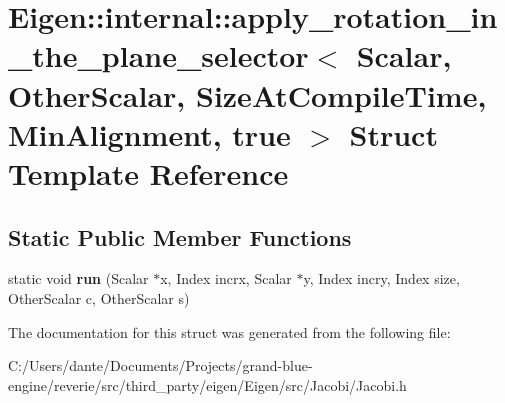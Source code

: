 \hypertarget{struct_eigen_1_1internal_1_1apply__rotation__in__the__plane__selector_3_01_scalar_00_01_other_scbca20de4cedcca0c18dc0bba81af1524}{}\section{Eigen\+::internal\+::apply\+\_\+rotation\+\_\+in\+\_\+the\+\_\+plane\+\_\+selector$<$ Scalar, Other\+Scalar, Size\+At\+Compile\+Time, Min\+Alignment, true $>$ Struct Template Reference}
\label{struct_eigen_1_1internal_1_1apply__rotation__in__the__plane__selector_3_01_scalar_00_01_other_scbca20de4cedcca0c18dc0bba81af1524}
\subsection*{Static Public Member Functions}
\begin{DoxyCompactItemize}
\item 
\mbox{\label{struct_eigen_1_1internal_1_1apply__rotation__in__the__plane__selector_3_01_scalar_00_01_other_scbca20de4cedcca0c18dc0bba81af1524_a0bd56f0d33dfe6f01354fa5df244ade9}} 
static void {\bfseries run} (Scalar $\ast$x, Index incrx, Scalar $\ast$y, Index incry, Index size, Other\+Scalar c, Other\+Scalar s)
\end{DoxyCompactItemize}


The documentation for this struct was generated from the following file\+:\begin{DoxyCompactItemize}
\item 
C\+:/\+Users/dante/\+Documents/\+Projects/grand-\/blue-\/engine/reverie/src/third\+\_\+party/eigen/\+Eigen/src/\+Jacobi/Jacobi.\+h\end{DoxyCompactItemize}
